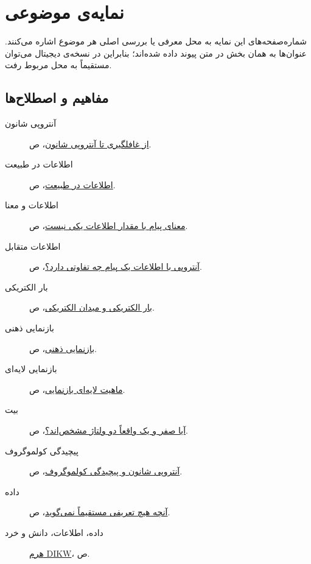 \chapter*{نمایه‌ی موضوعی}

شماره‌صفحه‌های این نمایه به محل معرفی یا بررسی اصلی هر موضوع اشاره
می‌کنند. عنوان‌ها به همان بخش در متن پیوند داده شده‌اند؛ بنابراین در
نسخه‌ی دیجیتال می‌توان مستقیماً به محل مربوط رفت.

\section*{مفاهیم و اصطلاح‌ها}
\begin{description}
  \item[آنتروپی شانون] \hyperref[sub:shannon-entropy]{از غافلگیری تا آنتروپی شانون}، ص.\ \pageref{sub:shannon-entropy}
  \item[اطلاعات در طبیعت] \hyperref[sec:information-in-nature]{اطلاعات در طبیعت}، ص.\ \pageref{sec:information-in-nature}
  \item[اطلاعات و معنا] \hyperref[sub:meaning-versus-information]{معنای پیام با مقدار اطلاعات یکی نیست}، ص.\ \pageref{sub:meaning-versus-information}
  \item[اطلاعات متقابل] \hyperref[sub:entropy-and-message-information]{آنتروپی با اطلاعات یک پیام چه تفاوتی دارد؟}، ص.\ \pageref{sub:entropy-and-message-information}
  \item[بار الکتریکی] \hyperref[sub:charge-and-electric-field]{بار الکتریکی و میدان الکتریکی}، ص.\ \pageref{sub:charge-and-electric-field}
  \item[بازنمایی ذهنی] \hyperref[sec:mental-representation]{بازنمایی ذهنی}، ص.\ \pageref{sec:mental-representation}
  \item[بازنمایی لایه‌ای] \hyperref[sec:layered-representation]{ماهیت لایه‌ای بازنمایی}، ص.\ \pageref{sec:layered-representation}
  \item[بیت] \hyperref[sub:logic-levels]{آیا صفر و یک واقعاً دو ولتاژ مشخص‌اند؟}، ص.\ \pageref{sub:logic-levels}
  \item[پیچیدگی کولموگروف] \hyperref[sub:kolmogorov-complexity]{آنتروپی شانون و پیچیدگی کولموگروف}، ص.\ \pageref{sub:kolmogorov-complexity}
  \item[داده] \hyperref[sec:what-no-definition-says]{آنچه هیچ تعریفی مستقیماً نمی‌گوید}، ص.\ \pageref{sec:what-no-definition-says}
  \item[داده، اطلاعات، دانش و خرد] \hyperref[sec:levels-of-data]{هرم DIKW}، ص.\ \pageref{sec:levels-of-data}

\end{description}
